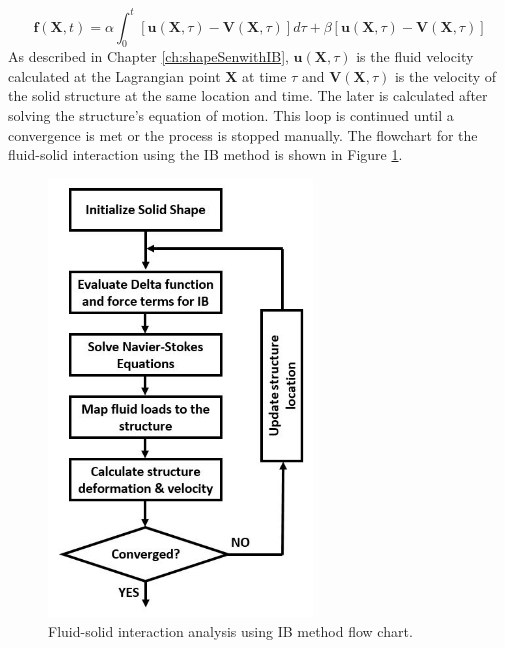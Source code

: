%
\begin{equation}\label{eq:C5_immersedBoundaryForceTerm}
    \mathbf{f}(\mathbf{X}, t) = 
    \alpha \int_0^t \left[ \mathbf{u}(\mathbf{X}, \tau) - \mathbf{V}(\mathbf{X}, \tau) \right] d\tau + 
    \beta \left[ \mathbf{u}(\mathbf{X}, \tau) - \mathbf{V}(\mathbf{X}, \tau) \right]
\end{equation}
%
As described in Chapter \ref{ch:shapeSenwithIB}, $\mathbf{u}(\mathbf{X}, \tau)$ is the fluid velocity calculated at the Lagrangian point $\mathbf{X}$ at time $\tau$ and $\mathbf{V}(\mathbf{X}, \tau)$ is the velocity of the solid structure at the same location and time. The later is calculated after solving the structure's equation of motion. This loop is continued until a convergence is met or the process is stopped manually. The flowchart for the fluid-solid interaction using the IB method is shown in Figure \ref{fig:C5_FSIflowchart}.
%
\begin{figure}[H]
    \centering
    \includegraphics[width=7.00cm]{Chapter_5/figure/Chapter5_FSI_FlowChart.jpg}
    \caption{Fluid-solid interaction analysis using IB method flow chart.}
    \label{fig:C5_FSIflowchart}
\end{figure}
%